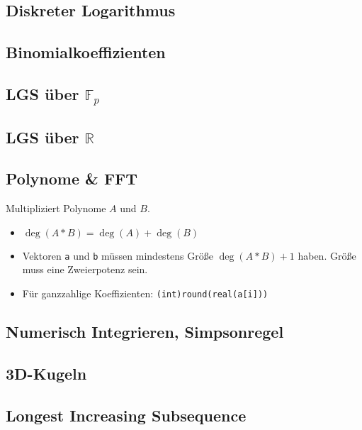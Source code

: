 \subsection{Diskreter Logarithmus}


\subsection{Binomialkoeffizienten}


\subsection{LGS über $\mathbb{F}_p$}


\subsection{LGS über $\mathbb{R}$}


\subsection{Polynome \& FFT}
Multipliziert Polynome $A$ und $B$.
\begin{itemize}[nosep]
	\item $\deg(A * B) = \deg(A) + \deg(B)$
	\item Vektoren \lstinline{a} und \lstinline{b} müssen mindestens Größe
	$\deg(A * B) + 1$ haben.
	Größe muss eine Zweierpotenz sein.
	\item Für ganzzahlige Koeffizienten: \lstinline{(int)round(real(a[i]))}
\end{itemize}


\subsection{Numerisch Integrieren, Simpsonregel}


\subsection{3D-Kugeln}


\subsection{Longest Increasing Subsequence}


